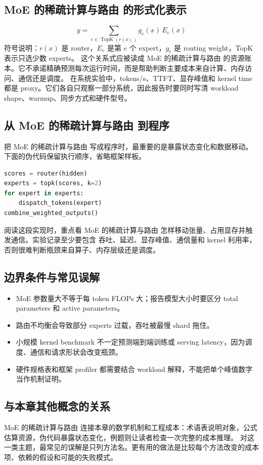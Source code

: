 \documentclass[a4paper]{article}
\begin{document}
\subsection{MoE 的稀疏计算与路由 的形式化表示}
\[y=\sum_{e\in \operatorname{TopK}(r(x))} g_e(x)\,E_e(x)\]
符号说明：\(r(x)\) 是 router，\(E_e\) 是第 \(e\) 个 expert，\(g_e\) 是 routing weight，TopK 表示只选少数 experts。
这个关系式应被读成 MoE 的稀疏计算与路由 的资源账本。它不承诺精确预测每次运行时间，而是帮助判断主要成本来自计算、内存访问、通信还是调度。
在系统实验中，tokens/s、TTFT、显存峰值和 kernel time 都是 proxy。它们各自只观察一部分系统，因此报告时要同时写清 workload shape、warmup、同步方式和硬件型号。
\subsection{从 MoE 的稀疏计算与路由 到程序}
把 MoE 的稀疏计算与路由 写成程序时，最重要的是暴露状态变化和数据移动。下面的伪代码保留执行顺序，省略框架样板。
\begin{lstlisting}[language=Python]
scores = router(hidden)
experts = topk(scores, k=2)
for expert in experts:
    dispatch_tokens(expert)
combine_weighted_outputs()
\end{lstlisting}
阅读这段实现时，重点看 MoE 的稀疏计算与路由 怎样移动张量、占用显存并触发通信。实验记录至少要包含 吞吐、延迟、显存峰值、通信量和 kernel 利用率，否则很难判断瓶颈来自算子、内存层级还是调度。
\subsection{边界条件与常见误解}
\begin{itemize}
\item MoE 参数量大不等于每 token FLOPs 大；报告模型大小时要区分 total parameters 和 active parameters。
\item 路由不均衡会导致部分 experts 过载，吞吐被最慢 shard 拖住。
\item 小规模 kernel benchmark 不一定预测端到端训练或 serving latency，因为调度、通信和请求形状会改变瓶颈。
\item 硬件规格表和框架 profiler 都需要结合 workload 解释，不能把单个峰值数字当作机制证明。
\end{itemize}
\subsection{与本章其他概念的关系}
MoE 的稀疏计算与路由 连接本章的数学机制和工程成本：术语表说明对象，公式估算资源，伪代码暴露状态变化，例题则让读者检查一次完整的成本推理。
对这一类主题，最常见的误解是只列方法名。更有用的做法是比较每个方法改变的成本项、依赖的假设和可能的失败模式。
\end{document}
